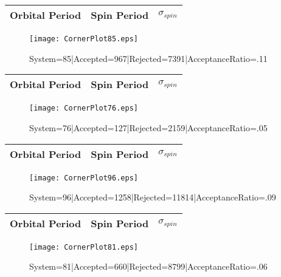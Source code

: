 \documentclass[10pt]{article}
\begin{document}
\listoffigures
\begin{center}
        \begin{tabular}{|c|c|c|}
        \hline
Orbital Period & Spin Period & $\sigma_{spin}$ \\
 \hline
        \end{tabular}
        \end{center}
\begin{figure}[h] 
        \texttt{[image: CornerPlot85.eps]}
        \caption{System=85|Accepted=967|Rejected=7391|AcceptanceRatio=.11}
        \label{S85}
        \centering
        \end{figure}
\begin{center}
        \begin{tabular}{|c|c|c|}
        \hline
Orbital Period & Spin Period & $\sigma_{spin}$ \\
 \hline
        \end{tabular}
        \end{center}
\begin{figure}[h] 
        \texttt{[image: CornerPlot76.eps]}
        \caption{System=76|Accepted=127|Rejected=2159|AcceptanceRatio=.05}
        \label{S76}
        \centering
        \end{figure}
\begin{center}
        \begin{tabular}{|c|c|c|}
        \hline
Orbital Period & Spin Period & $\sigma_{spin}$ \\
 \hline
        \end{tabular}
        \end{center}
\begin{figure}[h] 
        \texttt{[image: CornerPlot96.eps]}
        \caption{System=96|Accepted=1258|Rejected=11814|AcceptanceRatio=.09}
        \label{S96}
        \centering
        \end{figure}
\begin{center}
        \begin{tabular}{|c|c|c|}
        \hline
Orbital Period & Spin Period & $\sigma_{spin}$ \\
 \hline
        \end{tabular}
        \end{center}
\begin{figure}[h] 
        \texttt{[image: CornerPlot81.eps]}
        \caption{System=81|Accepted=660|Rejected=8799|AcceptanceRatio=.06}
        \label{S81}
        \centering
        \end{figure}
\end{document}
